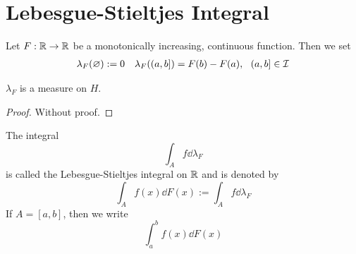 \documentclass[../../script.tex]{subfiles}
\begin{document}
\section{Lebesgue-Stieltjes Integral}

\begin{defi}
    Let $F: \mathbb{R} \rightarrow \mathbb{R}$ be a monotonically increasing, continuous function. Then we set 
    \begin{align*}
        \lambda_F(\varnothing) := 0 && \lambda_F((a, b]) = F(b) - F(a), ~~(a, b] \in \mathcal{I}
    \end{align*}
\end{defi}

\begin{thm}
    $\lambda_F$ is a measure on $H$.
\end{thm}
\begin{proof}
    Without proof.
\end{proof}

\begin{defi}
    The integral 
    \[
        \int_A f \dd{\lambda_F}
    \]
    is called the Lebesgue-Stieltjes integral on $\mathbb{R}$ and is denoted by 
    \[
        \int_A f(x) \dd{F(x)} := \int_A f \dd{\lambda_F}
    \]
    If $A = [a, b]$, then we write
    \[
        \int_a^b f(x) \dd{F(x)}
    \]
\end{defi}
\end{document}
